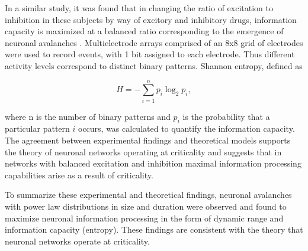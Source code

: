\documentclass[12pt]{article}
\begin{document}
In a similar study, it was found that in changing the ratio of excitation to inhibition in these subjects by way of excitory and inhibitory drugs, information capacity is maximized at a balanced ratio corresponding to the emergence of neuronal avalanches \cite{Shew2011a}. Multielectrode arrays comprised of an 8x8 grid of electrodes were used to record events, with 1 bit assigned to each electrode. Thus different activity levels correspond to distinct binary patterns. Shannon entropy, defined as

\begin{equation}
H = - \sum^{n}_{i=1}p_{i}\log_{2}p_{i},
\end{equation}

\noindent where n is the number of binary patterns and $ p_{i} $ is the probability that a particular pattern $i$ occurs, was calculated to quantify the information capacity. The agreement between experimental findings and theoretical models supports the theory of neuronal networks operating at criticality and suggests that in networks with balanced excitation and inhibition maximal information processing capabilities arise as a result of criticality. 

To summarize these experimental and theoretical findings, neuronal avalanches with power law distributions in size and duration were observed and found to maximize neuronal information processing in the form of dynamic range and information capacity (entropy). These findings are consistent with the theory that neuronal networks operate at criticality. 
\end{document}
